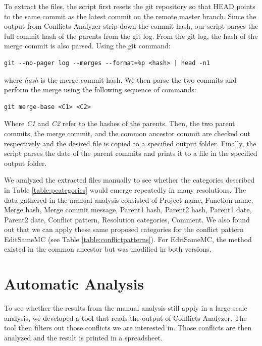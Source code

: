 To extract the files, the script first resets the git repository so that HEAD points to the same commit as the latest commit on the remote master branch. Since the output from Conflicts Analyzer strip down the commit hash, our script parses the full commit hash of the parents from the git log. From the git log, the hash of the merge commit is also parsed. Using the git command:
\lstset{language=Bash,numbers=left,xleftmargin=2em,frame=single,framexleftmargin=1.5em}
\begin{lstlisting}[frame=single,breaklines=true,tabsize=2]
git --no-pager log --merges --format=%p <hash> | head -n1
\end{lstlisting}
where \textit{hash} is the merge commit hash. We then parse the two commits and perform the merge using the following sequence of commands:\\
\lstset{language=Bash,numbers=left,xleftmargin=2em,frame=single,framexleftmargin=1.5em}
\begin{lstlisting}[frame=single,breaklines=true,tabsize=2]
git merge-base <C1> <C2>
\end{lstlisting}
Where \textit{C1} and \textit{C2} refer to the hashes of the parents.  Then, the two parent commits, the merge commit, and the common ancestor commit are checked out respectively and the desired file is copied to a specified output folder. Finally, the script parses the date of the parent commits and prints it to a file in the specified output folder.

We analyzed the extracted files manually to see whether the categories described in Table \ref{table:pcategories} would emerge repeatedly in many resolutions. The data gathered in the manual analysis consisted of Project name, Function name, Merge hash, Merge commit message, Parent1 hash, Parent2 hash, Parent1 date, Parent2 date, Conflict pattern, Resolution categories, Comment. We also found out that we can apply these same proposed categories for the conflict pattern EditSameMC (see Table \ref{table:conflictpatterns}). For EditSameMC, the method existed in the common ancestor but was modified in both versions.
\FloatBarrier
\section{Automatic Analysis}
To see whether the results from the manual analysis still apply in a large-scale analysis, we developed a tool that reads the output of Conflicts Analyzer. The tool then filters out those conflicts we are interested in. Those conflicts are then analyzed and the result is printed in a spreadsheet.

